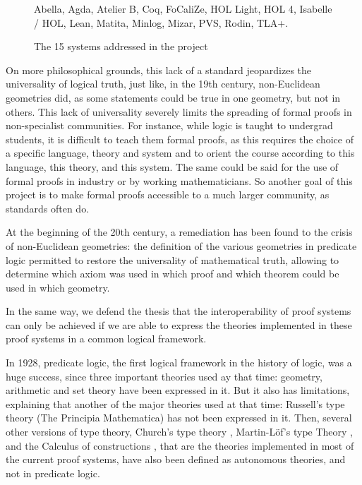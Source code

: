 \begin{figure}
{\sc Abella}, 
{\sc Agda}, 
{\sc Atelier B}, 
{\sc Coq}, 
{\sc FoCaliZe}, 
{\sc HOL Light}, 
{\sc HOL 4},
{\sc Isabelle / HOL},
{\sc Lean}, 
{\sc Matita}, 
{\sc Minlog}, 
{\sc Mizar}, 
{\sc PVS}, 
{\sc Rodin}, 
{\sc TLA+}.
\caption{The 15 systems addressed in the project}
\end{figure}

On more philosophical grounds, this lack of a standard jeopardizes the
universality of logical truth, just like, in the 19th century,
non-Euclidean geometries did, as some statements could be true in one
geometry, but not in others.  This lack of universality severely
limits the spreading of formal proofs in non-specialist
communities. For instance, while logic is taught to undergrad
students, it is difficult to teach them formal proofs, as this
requires the choice of a specific language, theory and system and to
orient the course according to this language, this theory, and this
system. The same could be said for the use of formal proofs in
industry or by working mathematicians. So another goal of this project
is to make formal proofs accessible to a much larger community, as
standards often do.

At the beginning of the 20th century, a remediation has been found to
the crisis of non-Euclidean geometries: the definition of the various
geometries in predicate logic \cite{HilbertAckermann} permitted to
restore the universality of mathematical truth, allowing to determine
which axiom was used in which proof and which theorem could be used in
which geometry.

In the same way, we defend the thesis that the interoperability of
proof systems can only be achieved if we are able to express the theories
implemented in these proof systems in a common logical framework.

In 1928, predicate logic, the first logical framework in the history
of logic, was a huge success, since three important theories used ay
that time: geometry, arithmetic and set theory have been expressed in
it. But it also has limitations, explaining that another of the major
theories used at that time: Russell's type theory (The Principia
Mathematica) has not been expressed in it.  Then, several other
versions of type theory, Church's type theory \cite{Church40},
Martin-L\"of's type Theory \cite{Martin-Lof84}, and the Calculus of
constructions \cite{CoquandHuet88}, that are the theories implemented
in most of the current proof systems, have also been defined as
autonomous theories, and not in predicate logic.

